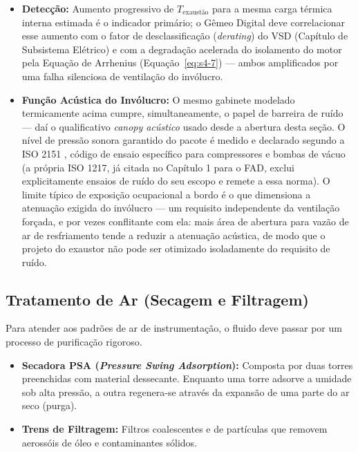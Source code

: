 \documentclass[12pt,a4paper]{article}
\numberwithin{equation}{section}
\numberwithin{table}{section}
\numberwithin{figure}{section}
\begin{document}
{\begin{itemize}
		\item \textbf{Detecção:} Aumento progressivo de $T_{\text{exaustão}}$ para a mesma carga térmica interna estimada é o indicador primário; o Gêmeo Digital deve correlacionar esse aumento com o fator de desclassificação (\textit{derating}) do VSD (Capítulo de Subsistema Elétrico) e com a degradação acelerada do isolamento do motor pela Equação de Arrhenius (Equação~\eqref{eq:s4-7}) — ambos amplificados por uma falha silenciosa de ventilação do invólucro.
		\item \textbf{Função Acústica do Invólucro:} O mesmo gabinete modelado termicamente acima cumpre, simultaneamente, o papel de barreira de ruído — daí o qualificativo \textit{canopy acústico} usado desde a abertura desta seção. O nível de pressão sonora garantido do pacote é medido e declarado segundo a ISO 2151 \cite{iso2151}, código de ensaio específico para compressores e bombas de vácuo (a própria ISO 1217, já citada no Capítulo 1 para o FAD, exclui explicitamente ensaios de ruído do seu escopo e remete a essa norma). O limite típico de exposição ocupacional a bordo é o que dimensiona a atenuação exigida do invólucro — um requisito independente da ventilação forçada, e por vezes conflitante com ela: mais área de abertura para vazão de ar de resfriamento tende a reduzir a atenuação acústica, de modo que o projeto do exaustor não pode ser otimizado isoladamente do requisito de ruído.
	\end{itemize}

	\subsection{\textbf{Tratamento de Ar (Secagem e Filtragem)}}
	Para atender aos padrões de ar de instrumentação, o fluido deve passar por um processo de purificação rigoroso.
	\begin{itemize}
		\item \textbf{Secadora PSA (\textit{Pressure Swing Adsorption}):} Composta por duas torres preenchidas com material dessecante. Enquanto uma torre adsorve a umidade sob alta pressão, a outra regenera-se através da expansão de uma parte do ar seco (purga).
		\item \textbf{Trens de Filtragem:} Filtros coalescentes e de partículas que removem aerossóis de óleo e contaminantes sólidos.
	\end{itemize}
	
}
\end{document}
